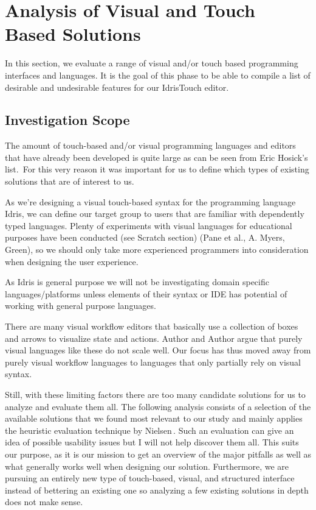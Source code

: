 \section{Analysis of Visual and Touch Based Solutions}
\label{sec:Analysis}

In this section, we evaluate a range of visual and/or touch based programming interfaces and languages. It is the goal of this phase to be able to compile a list of desirable and undesirable features for our IdrisTouch editor.

\subsection{Investigation Scope}
The amount of touch-based and/or visual programming languages and editors that have already been developed is quite large as can be seen from Eric Hosick's list.\,\cite{hosick2014} For this very reason it was important for us to define which types of existing solutions that are of interest to us.

As we’re designing a visual touch-based syntax for the programming language Idris, we can define our target group to users that are familiar with dependently typed languages. Plenty of experiments with visual languages for educational purposes have been conducted (see Scratch section) (Pane et al., A. Myers, Green), so we should only take more experienced programmers into consideration when designing the user experience.

As Idris is general purpose we will not be investigating domain specific languages/platforms unless elements of their syntax or IDE has potential of working with general purpose languages.

There are many visual workflow editors that basically use a collection of boxes and arrows to visualize state and actions. Author and Author  argue that purely visual languages like these do not scale well. Our focus has thus moved away from purely visual workflow languages to languages that only partially rely on visual syntax.

Still, with these limiting factors there are too many candidate solutions for us to analyze and evaluate them all. The following analysis consists of a selection of the available solutions that we found most relevant to our study and mainly applies the heuristic evaluation technique by Nielsen\,\cite{nielsen1990heuristic}. Such an evaluation can give an idea of possible usability issues but I will not help discover them all. This suits our purpose, as it is our mission to get an overview of the major pitfalls as well as what generally works well when designing our solution. Furthermore, we are pursuing an entirely new type of touch-based, visual, and structured interface instead of bettering an existing one so analyzing a few existing solutions in depth does not make sense.

